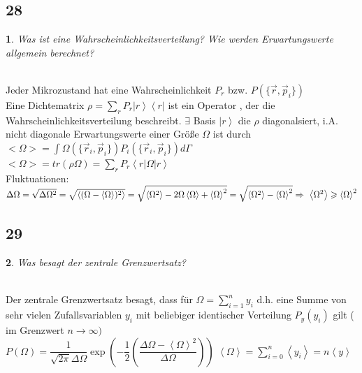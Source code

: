\documentclass[12pt,a4paper]{report}
\newtheorem{myfrag}{}%
\begin{document}
\subsection{28}
\begin{myfrag}
Was ist eine Wahrscheinlichkeitsverteilung? Wie werden Erwartungswerte
allgemein berechnet?
\end{myfrag} \quad \\
Jeder Mikrozustand hat eine Wahrscheinlichkeit $P_r$ bzw. $P(\{ \vec{r},\vec{p} _i \} )$ \\ Eine Dichtematrix $\rho = \sum_r P_r \left|r\right\rangle \left\langle r \right| $ ist ein Operator , der die Wahrscheinlichkeitsverteilung beschreibt. $\exists$ Basis $\left| r \right\rangle$ die $\rho $ diagonalsiert, i.A. nicht diagonale Erwartungswerte einer Größe $\Omega $ ist durch \\[1ex]
$<\Omega > = \int \Omega ( \{ \vec{r} _i , \vec{p} _i \}) P_i(\{ \vec{r} _i , \vec{p} _i \} ) d\Gamma $\\[1ex]
$<\Omega> = tr(\rho \Omega )= \sum _ r P_r \left\langle r \right| \Omega \left| r \right\rangle $ \\
Fluktuationen: \\[1ex]
$\Delta \Omega = \sqrt{\Delta \Omega ^2} = \sqrt{\left\langle (\Omega - \left\langle \Omega \right\rangle ) ^2 \right\rangle} = \sqrt{\left\langle \Omega ^2 \right\rangle - 2 \Omega \left\langle \Omega \right\rangle  + \left\langle \Omega \right\rangle ^2} = \sqrt{\left\langle \Omega ^2 \right\rangle - \left\langle \Omega \right\rangle ^2} \\ \Rightarrow \ \left\langle \Omega ^2 \right\rangle \geqslant  \left\langle \Omega \right\rangle ^2 $
\subsection{29}
\begin{myfrag}
Was besagt der zentrale Grenzwertsatz?
\end{myfrag} \quad \\
Der zentrale Grenzwertsatz besagt, dass für $ \Omega = \sum \limits_{i=1}^n y_i $ d.h. eine Summe von sehr vielen Zufallsvariablen $y_i$ mit beliebiger identischer Verteilung $P_y(y_i)$ gilt ( im Grenzwert $ n \rightarrow \infty) $ \\[1ex]
$ P (\Omega ) = \dfrac{1}{\sqrt{2 \pi}\Delta \Omega } \exp\left(- \dfrac{1}{2} \left( \dfrac{\Delta \Omega - \left\langle \Omega \right\rangle ^2}{\Delta \Omega} \right) \right)$  \qquad $ \left\langle \Omega \right\rangle  = \sum \limits_{i=0}^n \left\langle y_i \right\rangle = n \left\langle y \right\rangle $
\end{document}
